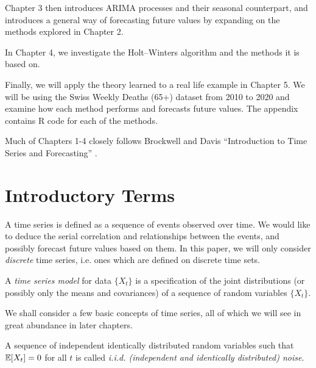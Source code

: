 \documentclass[a4paper, oneside]{discothesis}
\begin{document}
Chapter 3 then introduces ARIMA processes and their seasonal counterpart, and introduces a general way of forecasting future values by expanding on the methods explored in Chapter 2.

In Chapter 4, we investigate the Holt--Winters algorithm and the methods it is based on.

Finally, we will apply the theory learned to a real life example in Chapter 5. We will be using the Swiss Weekly Deaths (65+) dataset from 2010 to 2020 and examine how each method performs and forecasts future values. The appendix contains R code for each of the methods.

Much of Chapters 1-4 closely follows Brockwell and Davis ``Introduction to Time Series and Forecasting'' \cite{itsf}.

\newpage

\section{Introductory Terms}
A time series is defined as a sequence of events observed over time. We would like to deduce the serial correlation and relationships between the events, and possibly forecast future values based on them. In this paper, we will only consider \textit{discrete} time series, i.e. ones which are defined on discrete time sets.

\begin{definition}
	A \textit{time series model} for data $\{X_t\}$ is a specification of the joint distributions (or possibly only the means and covariances) of a sequence of random variables $\{X_t\}$.
\end{definition}

We shall consider a few basic concepts of time series, all of which we will see in great abundance in later chapters.

\begin{definition}
    A sequence of independent identically distributed random variables such that $\operatorname{\mathbb{E}}[X_t] = 0$ for all $t$ is called \textit{i.i.d. (independent and identically distributed) noise}.
\end{definition}

\end{document}
